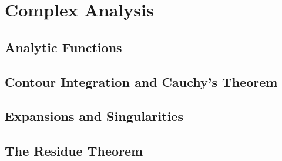 \documentclass[main.tex]{subfiles}
\begin{document}
	\chapter{Complex Analysis}
		\section{Analytic Functions}
		
		\section{Contour Integration and Cauchy's Theorem}
		
		\section{Expansions and Singularities}
		
		\section{The Residue Theorem}
				
\end{document}
